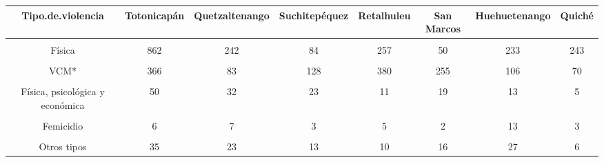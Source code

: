 \begin{tabular}[t]{cccccccc}
\toprule
\textbf{Tipo.de.violencia} & \textbf{Totonicapán} & \textbf{Quetzaltenango} & \textbf{Suchitepéquez} & \textbf{Retalhuleu} & \textbf{San Marcos} & \textbf{Huehuetenango} & \textbf{Quiché}\\
\midrule
\cellcolor[HTML]{B6B3FF}{Psicológica} & \cellcolor[HTML]{B6B3FF}{1063} & \cellcolor[HTML]{B6B3FF}{687} & \cellcolor[HTML]{B6B3FF}{487} & \cellcolor[HTML]{B6B3FF}{579} & \cellcolor[HTML]{B6B3FF}{822} & \cellcolor[HTML]{B6B3FF}{724} & \cellcolor[HTML]{B6B3FF}{77}\\
Física & 862 & 242 & 84 & 257 & 50 & 233 & 243\\
\cellcolor[HTML]{B6B3FF}{Física y psicológica} & \cellcolor[HTML]{B6B3FF}{768} & \cellcolor[HTML]{B6B3FF}{316} & \cellcolor[HTML]{B6B3FF}{494} & \cellcolor[HTML]{B6B3FF}{152} & \cellcolor[HTML]{B6B3FF}{257} & \cellcolor[HTML]{B6B3FF}{211} & \cellcolor[HTML]{B6B3FF}{98}\\
VCM* & 366 & 83 & 128 & 380 & 255 & 106 & 70\\
\cellcolor[HTML]{B6B3FF}{Psicológica y económica} & \cellcolor[HTML]{B6B3FF}{71} & \cellcolor[HTML]{B6B3FF}{24} & \cellcolor[HTML]{B6B3FF}{25} & \cellcolor[HTML]{B6B3FF}{12} & \cellcolor[HTML]{B6B3FF}{14} & \cellcolor[HTML]{B6B3FF}{27} & \cellcolor[HTML]{B6B3FF}{3}\\
Física, psicológica y económica & 50 & 32 & 23 & 11 & 19 & 13 & 5\\
\cellcolor[HTML]{B6B3FF}{VCM y económica} & \cellcolor[HTML]{B6B3FF}{36} & \cellcolor[HTML]{B6B3FF}{18} & \cellcolor[HTML]{B6B3FF}{8} & \cellcolor[HTML]{B6B3FF}{8} & \cellcolor[HTML]{B6B3FF}{3} & \cellcolor[HTML]{B6B3FF}{6} & \cellcolor[HTML]{B6B3FF}{3}\\
Femicidio & 6 & 7 & 3 & 5 & 2 & 13 & 3\\
\cellcolor[HTML]{B6B3FF}{Física y económica} & \cellcolor[HTML]{B6B3FF}{22} & \cellcolor[HTML]{B6B3FF}{2} & \cellcolor[HTML]{B6B3FF}{3} & \cellcolor[HTML]{B6B3FF}{1} & \cellcolor[HTML]{B6B3FF}{1} & \cellcolor[HTML]{B6B3FF}{NA} & \cellcolor[HTML]{B6B3FF}{3}\\
Otros tipos & 35 & 23 & 13 & 10 & 16 & 27 & 6\\
\bottomrule
\end{tabular}
